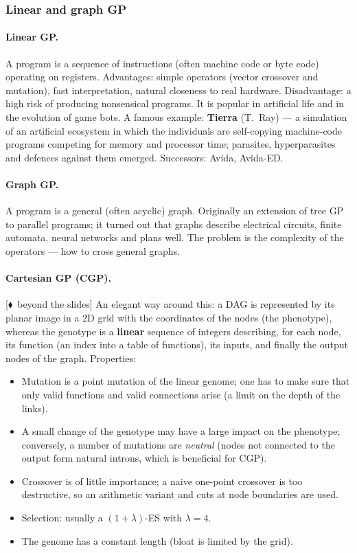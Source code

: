 \documentclass[11pt,a4paper]{article}
\theoremstyle{definition}
\newcommand{\mimo}{\textcolor{markcol}{\textsf{\footnotesize[$\blacklozenge$~beyond the slides]}}}
\begin{document}
\subsubsection{Linear and graph GP}

\paragraph{Linear GP.} A program is a sequence of instructions (often machine
code or byte code) operating on registers. Advantages: simple operators (vector
crossover and mutation), fast interpretation, natural closeness to real
hardware. Disadvantage: a high risk of producing nonsensical programs. It is
popular in artificial life and in the evolution of game bots. A famous example:
\textbf{Tierra} (T.~Ray) --- a simulation of an artificial ecosystem in which
the individuals are self-copying machine-code programs competing for memory and
processor time; parasites, hyperparasites and defences against them emerged.
Successors: Avida, Avida-ED.

\paragraph{Graph GP.} A program is a general (often acyclic) graph. Originally
an extension of tree GP to parallel programs; it turned out that graphs describe
electrical circuits, finite automata, neural networks and plans well. The
problem is the complexity of the operators --- how to cross general graphs.

\paragraph{Cartesian GP (CGP).} \mimo{} An elegant way around this: a DAG is represented
by its planar image in a 2D grid with the coordinates of the nodes (the
phenotype), whereas the genotype is a \textbf{linear} sequence of integers
describing, for each node, its function (an index into a table of functions),
its inputs, and finally the output nodes of the graph. Properties:
\begin{itemize}
\item Mutation is a point mutation of the linear genome; one has to make sure
  that only valid functions and valid connections arise (a limit on the depth of
  the links).
\item A small change of the genotype may have a large impact on the phenotype;
  conversely, a number of mutations are \emph{neutral} (nodes not connected to
  the output form natural introns, which is beneficial for CGP).
\item Crossover is of little importance; a naive one-point crossover is too
  destructive, so an arithmetic variant and cuts at node boundaries are used.
\item Selection: usually a $(1+\lambda)$-ES with $\lambda = 4$.
\item The genome has a constant length (bloat is limited by the grid).
\end{itemize}
\end{document}
